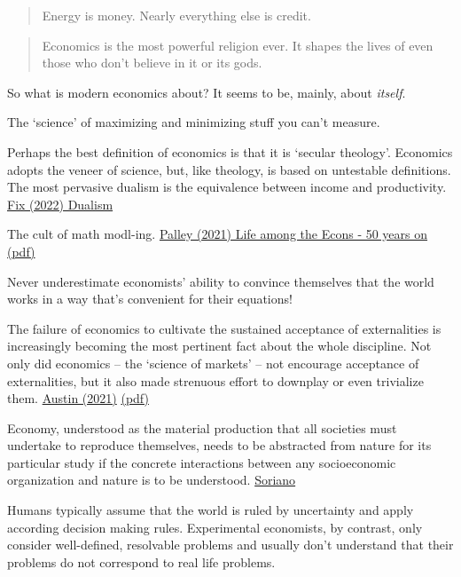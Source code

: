 \documentclass[
]{book}
\begin{document}
\begin{quote}
Energy is money. Nearly everything else is credit.
\end{quote}

\begin{quote}
Economics is the most powerful religion ever.
It shapes the lives of even those who don't believe in it or its gods.
\end{quote}

So what is modern economics about? It seems to be, mainly, about \emph{itself}.

The `science' of maximizing and minimizing stuff you can't measure.

Perhaps the best definition of economics is that it is `secular theology'.
Economics adopts the veneer of science, but, like theology, is based on untestable definitions. The most pervasive dualism is the equivalence between income and productivity.
\href{https://economicsfromthetopdown.com/2022/08/10/dualism-in-science-theology-and-economics/}{Fix (2022) Dualism}

The cult of math modl-ing.
\href{pdf/Thomas_Palley_2106_Life_among_the_Econ_50yrs.pdf}{Palley (2021) Life among the Econs - 50 years on (pdf)}

Never underestimate economists' ability to convince themselves that the world works in a way that's convenient for their equations!

The failure of economics to cultivate the sustained acceptance of externalities is increasingly
becoming the most pertinent fact about the whole discipline. Not only did economics -- the `science
of markets' -- not encourage acceptance of externalities, but it also made strenuous effort to
downplay or even trivialize them.
\href{https://bothbrainsrequire\%20d.com/2021/10/25/fix-that-fails/}{Austin (2021)}
\href{pdf/Austin_2021_Market_Led_Sustainability_Fix_Fails.pdf}{(pdf)}

Economy, understood as the material production that all societies must undertake to reproduce themselves, needs to be abstracted from nature for its particular study if the concrete interactions between any socioeconomic organization and nature is to be understood.
\href{https://monthlyreview.org/2022/11/01/anthropocene-capitalocene-and-other-cenes-why-a-correct-understanding-of-marxs-theory-of-value-is-necessary-to-leave-the-planetary-crisis/}{Soriano}

Humans typically assume that the world is ruled by uncertainty and apply according decision making rules. Experimental economists, by contrast, only consider well-defined, resolvable problems and usually don't understand that their problems do not correspond to real life problems.
\end{document}
